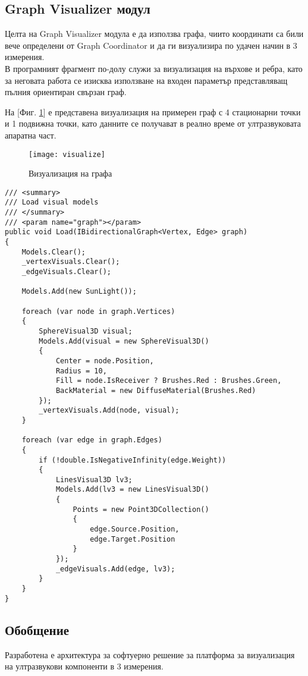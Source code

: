 \subsection{Graph Visualizer модул}
Целта на Graph Visualizer модула е да използва графа, чиито координати са били вече определени от Graph Coordinator и да ги визуализира по удачен начин в 3 измерения.\\
В програмният фрагмент по-долу служи за визуализация на върхове и ребра, като за неговата работа се изисква използване на входен параметър представляващ пълния ориентиран свързан граф.

На [Фиг. \ref{fig:visualize}] е представена визуализация на примерен граф с 4 стационарни точки и 1 подвижна точки, като данните се получават в реално време от ултразвуковата апаратна част.
\begin{figure}
    \centerline{\texttt{[image: visualize]}}
    \caption{Визуализация на графа}
    \label{fig:visualize}
\end{figure}


\begin{lstlisting}
/// <summary>
/// Load visual models
/// </summary>
/// <param name="graph"></param>
public void Load(IBidirectionalGraph<Vertex, Edge> graph)
{
    Models.Clear();
    _vertexVisuals.Clear();
    _edgeVisuals.Clear();

    Models.Add(new SunLight());

    foreach (var node in graph.Vertices)
    {
        SphereVisual3D visual;
        Models.Add(visual = new SphereVisual3D()
        {
            Center = node.Position,
            Radius = 10,
            Fill = node.IsReceiver ? Brushes.Red : Brushes.Green,
            BackMaterial = new DiffuseMaterial(Brushes.Red)
        });
        _vertexVisuals.Add(node, visual);
    }

    foreach (var edge in graph.Edges)
    {
        if (!double.IsNegativeInfinity(edge.Weight))
        {
            LinesVisual3D lv3;
            Models.Add(lv3 = new LinesVisual3D()
            {
                Points = new Point3DCollection()
                {
                    edge.Source.Position,
                    edge.Target.Position
                }
            });
            _edgeVisuals.Add(edge, lv3);
        }
    }
}
\end{lstlisting}



\subsection{Обобщение}
Разработена е архитектура за софтуерно решение за платформа за визуализация на ултразвукови компоненти в 3 измерения. 